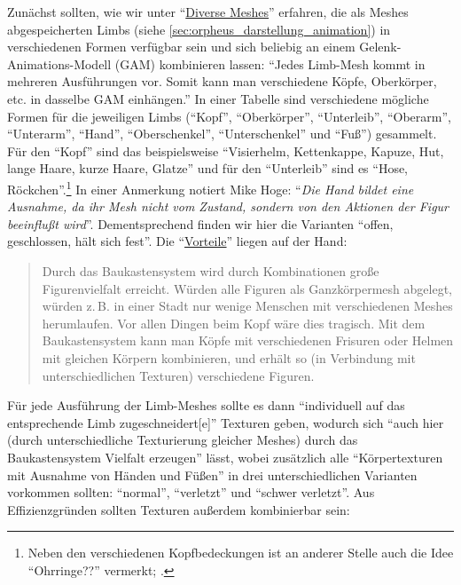 \documentclass[a5paper,pagesize,numbers=noenddot]{scrbook}
\begin{document}
Zunächst sollten, wie wir unter \enquote{\uline{Diverse Meshes}} erfahren, die als Meshes abgespeicherten Limbs (siehe \autoref{sec:orpheus_darstellung_animation}) in verschiedenen Formen verfügbar sein und sich beliebig an einem Gelenk-Animations-Modell (GAM) kombinieren lassen:
\enquote{Jedes Limb-Mesh kommt in mehreren Ausführungen vor.
Somit kann man verschiedene Köpfe, Oberkörper, etc. in dasselbe GAM einhängen.}
In einer Tabelle sind verschiedene mögliche Formen für die jeweiligen Limbs (\enquote{Kopf}, \enquote{Oberkörper}, \enquote{Unterleib}, \enquote{Oberarm}, \enquote{Unterarm}, \enquote{Hand}, \enquote{Oberschenkel}, \enquote{Unterschenkel} und \enquote{Fuß}) gesammelt.
Für den \enquote{Kopf} sind das beispielsweise \enquote{Visierhelm, Kettenkappe, Kapuze, Hut, lange Haare, kurze Haare, Glatze} und für den \enquote{Unterleib} sind es \enquote{Hose, Röckchen}.\footnote{Neben den verschiedenen Kopfbedeckungen ist an anderer Stelle auch die Idee \enquote{Ohrringe??} vermerkt; \autocite[S.~8]{orpheus_b_scribbles}.}
In einer Anmerkung notiert Mike Hoge: \enquote{\textit{Die Hand bildet eine Ausnahme, da ihr Mesh nicht vom Zustand, sondern von den Aktionen der Figur beeinflußt wird}}.
Dementsprechend finden wir hier die Varianten \enquote{offen, geschlossen, hält sich fest}.\autocite[S.~2]{orpheus_zusammenfassung_1996}
Die \enquote{\uline{Vorteile}} liegen auf der Hand:

\begin{quote}
   Durch das Baukastensystem wird durch Kombinationen große Figurenvielfalt erreicht.
   Würden alle Figuren als Ganzkörpermesh abgelegt, würden z.\,B. in einer Stadt nur wenige Menschen mit verschiedenen Meshes herumlaufen.
   Vor allen Dingen beim Kopf wäre dies tragisch.
   Mit dem Baukastensystem kann man Köpfe mit verschiedenen Frisuren oder Helmen mit gleichen Körpern kombinieren, und erhält so (in Verbindung mit unterschiedlichen Texturen) verschiedene Figuren.\autocite[S.~2]{orpheus_zusammenfassung_1996}
\end{quote}

Für jede Ausführung der Limb-Meshes sollte es dann \enquote{individuell auf das entsprechende Limb zugeschneidert[e]} Texturen geben, wodurch sich \enquote{auch hier (durch unterschiedliche Texturierung gleicher Meshes) durch das Baukastensystem Vielfalt erzeugen}\autocite[S.~2]{orpheus_zusammenfassung_1996} lässt, wobei zusätzlich alle \enquote{Körpertexturen mit Ausnahme von Händen und Füßen} in drei unterschiedlichen Varianten vorkommen sollten: \enquote{normal}, \enquote{verletzt} und \enquote{schwer verletzt}.\autocite[S.~3]{orpheus_zusammenfassung_1996}
Aus Effizienzgründen sollten Texturen außerdem kombinierbar sein:
\end{document}
